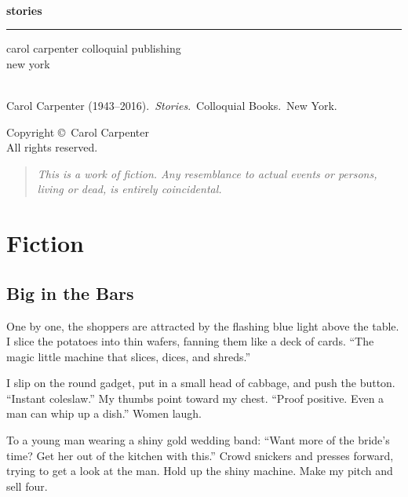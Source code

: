 \documentclass[twoside,10pt]{book}
\author{}
\date{}
\begin{document}
\pagestyle{empty}
\cleardoublepage
\mbox{ }
\cleardoublepage
\frontmatter
\begin{center}
  \vspace*{48pt}
  \hfill {\fontsize{86}{52}\sffamily\bfseries stories}
  \\[12pt]
  \hrule height 1pt
  \hfill {\fontsize{24}{52}\sffamily carol carpenter}
  \vfill
  \hfill {\sffamily colloquial publishing}
  \\
  \hfill {\sffamily new york}
\end{center}
\color{black} %


\clearpage
\pagecolor{white}
\mbox{}
\\[36pt]
Carol Carpenter (1943--2016).~\textit{Stories}.~Colloquial Books.~New
York. 
\\[12pt]
\begin{center}
Copyright \copyright\, Carol Carpenter
\\[4pt]
All rights reserved.
\end{center}
\vfill
\begin{quote}
\emph{This is a work of fiction. Any resemblance to actual events or
persons, living or dead, is entirely coincidental.}
\end{quote}
\vfill
\vfill
\null

\cleardoublepage
\pagestyle{fancy}
\tableofcontents


\mainmatter
\cleardoublepage
\part{Fiction}
\thispagestyle{empty}

\cleardoublepage
\chapter{Big in the Bars}

One by one, the shoppers are attracted by the flashing blue light above
the table. I slice the potatoes into thin wafers, fanning them like a
deck of cards. ``The magic little machine that slices, dices, and
shreds.''

I slip on the round gadget, put in a small head of cabbage, and push the
button. ``Instant coleslaw.'' My thumbs point toward my chest. ``Proof
positive. Even a man can whip up a dish.'' Women laugh.

To a young man wearing a shiny gold wedding band: ``Want more of the
bride's time? Get her out of the kitchen with this.'' Crowd snickers and
presses forward, trying to get a look at the man. Hold up the shiny
machine. Make my pitch and sell four.
\end{document}

